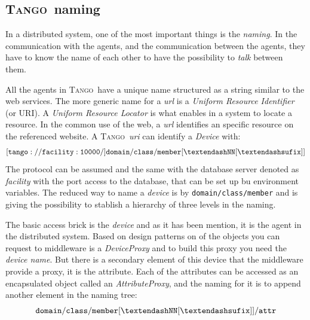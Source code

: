 \documentclass[10pt,a4paper,twoside]{llncs}
\newcommand{\tango}{\textsc{Tango}}
\begin{document}
\subsection{\tango\, naming}

In a distributed system, one of the most important things is the \emph{naming}. In the communication with the agents, and the communication between the agents, they have to know the name of each other to have the possibility to \emph{talk} between them.

All the agents in \tango\, have a unique name structured as a string similar to the web services. The more generic name for a \emph{url} is a \emph{Uniform Resource Identifier} (or URI). A \emph{Uniform Resource Locator} is what enables in a system to locate a resource. In the common use of the web, a \emph{url} identifies an specific resource on the referenced website. A \tango\, \emph{uri} can identify a \emph{Device} with:
\begin{equation}
    {\tt [tango://facility:10000/]domain/class/member[\textendash NN[\textendash sufix]]}\label{eq:tangoDeviceFullName}
\end{equation}
The protocol can be assumed and the same with the database server denoted as \emph{facility} with the port access to the database, that can be set up bu environment variables. The reduced way to name a \emph{device} is by {\tt domain/class/member} and is giving the possibility to stablish a hierarchy of three levels in the naming.

The basic access brick is the \emph{device} and as it has been mention, it is the agent in the distributed system. Based on design patterns on of the objects you can request to middleware is a \emph{DeviceProxy} and to build this proxy you need the \emph{device name}. But there is a secondary element of this device that the middleware provide a proxy, it is the attribute. Each of the attributes can be accessed as an encapsulated object called an \emph{AttributeProxy}, and the naming for it is to append another element in the naming tree:
\begin{equation}
    {\tt domain/class/member[\textendash NN[\textendash sufix]]/attr}\label{eq:tangoAttrName}
\end{equation}
\end{document}
